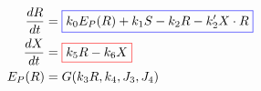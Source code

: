 \documentclass[preview]{standalone}
\begin{document}
\pagestyle{empty}
\begin{equation*}
\begin{aligned}
	\frac{dR}{dt} & = {\color{blue}\boxed{\color{black} k_0 E_P(R) + k_1 S  - k_2 R - k_2' X \cdot R}} \\ 
	\frac{dX}{dt} & = {\color{red}\boxed{\color{black} k_5 R - k_6 X}} \\ 
	E_P(R) & = G(k_3 R, k_4, J_3, J_4)
\end{aligned}
\end{equation*}
\vfill
\end{document}
